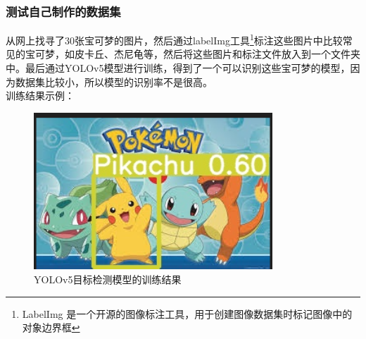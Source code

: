 \documentclass{nwputhesis}
\begin{document}
\subsubsection{测试自己制作的数据集}
从网上找寻了30张宝可梦的图片，然后通过labelImg工具\footnote{LabelImg 是一个开源的图像标注工具，用于创建图像数据集时标记图像中的对象边界框}标注这些图片中比较常见的宝可梦，如皮卡丘、杰尼龟等，然后将这些图片和标注文件放入到一个文件夹中。最后通过YOLOv5模型进行训练，得到了一个可以识别这些宝可梦的模型，因为数据集比较小，所以模型的识别率不是很高。
\\
\indent 训练结果示例：
\begin{figure}[H]
    \centering
    \includegraphics[width=0.8\textwidth]{picture/3.png}
    \caption{YOLOv5目标检测模型的训练结果}
\end{figure}
\end{document}
